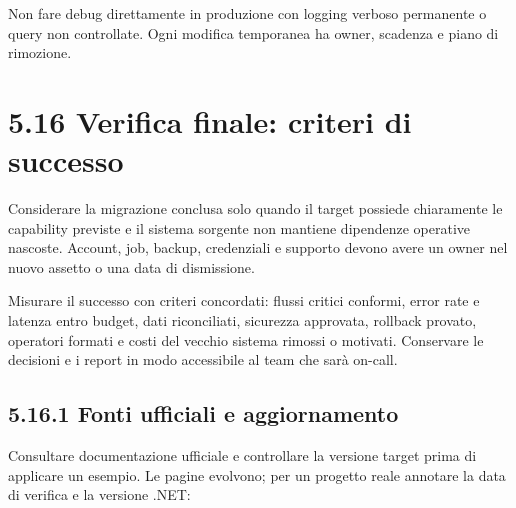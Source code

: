 \documentclass[
  italian,
  10pt,
]{book}
\begin{document}
Non fare debug direttamente in produzione con logging verboso permanente
o query non controllate. Ogni modifica temporanea ha owner, scadenza e
piano di rimozione.

\section{5.16 Verifica finale: criteri di
successo}\label{verifica-finale-criteri-di-successo}

Considerare la migrazione conclusa solo quando il target possiede
chiaramente le capability previste e il sistema sorgente non mantiene
dipendenze operative nascoste. Account, job, backup, credenziali e
supporto devono avere un owner nel nuovo assetto o una data di
dismissione.

Misurare il successo con criteri concordati: flussi critici conformi,
error rate e latenza entro budget, dati riconciliati, sicurezza
approvata, rollback provato, operatori formati e costi del vecchio
sistema rimossi o motivati. Conservare le decisioni e i report in modo
accessibile al team che sarà on-call.

\subsection{5.16.1 Fonti ufficiali e
aggiornamento}\label{fonti-ufficiali-e-aggiornamento}

Consultare documentazione ufficiale e controllare la versione target
prima di applicare un esempio. Le pagine evolvono; per un progetto reale
annotare la data di verifica e la versione .NET:
\end{document}
